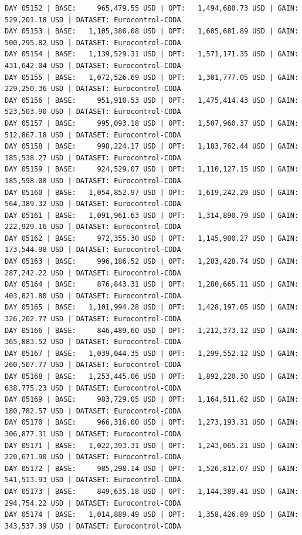 \documentclass[11pt,a4paper]{article}
\begin{document}
\begin{verbatim}
DAY 05152 | BASE:     965,479.55 USD | OPT:   1,494,680.73 USD | GAIN: 529,201.18 USD | DATASET: Eurocontrol-CODA
DAY 05153 | BASE:   1,105,386.08 USD | OPT:   1,605,681.89 USD | GAIN: 500,295.82 USD | DATASET: Eurocontrol-CODA
DAY 05154 | BASE:   1,139,529.31 USD | OPT:   1,571,171.35 USD | GAIN: 431,642.04 USD | DATASET: Eurocontrol-CODA
DAY 05155 | BASE:   1,072,526.69 USD | OPT:   1,301,777.05 USD | GAIN: 229,250.36 USD | DATASET: Eurocontrol-CODA
DAY 05156 | BASE:     951,910.53 USD | OPT:   1,475,414.43 USD | GAIN: 523,503.90 USD | DATASET: Eurocontrol-CODA
DAY 05157 | BASE:     995,093.18 USD | OPT:   1,507,960.37 USD | GAIN: 512,867.18 USD | DATASET: Eurocontrol-CODA
DAY 05158 | BASE:     998,224.17 USD | OPT:   1,183,762.44 USD | GAIN: 185,538.27 USD | DATASET: Eurocontrol-CODA
DAY 05159 | BASE:     924,529.07 USD | OPT:   1,110,127.15 USD | GAIN: 185,598.08 USD | DATASET: Eurocontrol-CODA
DAY 05160 | BASE:   1,054,852.97 USD | OPT:   1,619,242.29 USD | GAIN: 564,389.32 USD | DATASET: Eurocontrol-CODA
DAY 05161 | BASE:   1,091,961.63 USD | OPT:   1,314,890.79 USD | GAIN: 222,929.16 USD | DATASET: Eurocontrol-CODA
DAY 05162 | BASE:     972,355.30 USD | OPT:   1,145,900.27 USD | GAIN: 173,544.98 USD | DATASET: Eurocontrol-CODA
DAY 05163 | BASE:     996,186.52 USD | OPT:   1,283,428.74 USD | GAIN: 287,242.22 USD | DATASET: Eurocontrol-CODA
DAY 05164 | BASE:     876,843.31 USD | OPT:   1,280,665.11 USD | GAIN: 403,821.80 USD | DATASET: Eurocontrol-CODA
DAY 05165 | BASE:   1,101,994.28 USD | OPT:   1,428,197.05 USD | GAIN: 326,202.77 USD | DATASET: Eurocontrol-CODA
DAY 05166 | BASE:     846,489.60 USD | OPT:   1,212,373.12 USD | GAIN: 365,883.52 USD | DATASET: Eurocontrol-CODA
DAY 05167 | BASE:   1,039,044.35 USD | OPT:   1,299,552.12 USD | GAIN: 260,507.77 USD | DATASET: Eurocontrol-CODA
DAY 05168 | BASE:   1,253,445.06 USD | OPT:   1,892,220.30 USD | GAIN: 638,775.23 USD | DATASET: Eurocontrol-CODA
DAY 05169 | BASE:     983,729.05 USD | OPT:   1,164,511.62 USD | GAIN: 180,782.57 USD | DATASET: Eurocontrol-CODA
DAY 05170 | BASE:     966,316.00 USD | OPT:   1,273,193.31 USD | GAIN: 306,877.31 USD | DATASET: Eurocontrol-CODA
DAY 05171 | BASE:   1,022,393.31 USD | OPT:   1,243,065.21 USD | GAIN: 220,671.90 USD | DATASET: Eurocontrol-CODA
DAY 05172 | BASE:     985,298.14 USD | OPT:   1,526,812.07 USD | GAIN: 541,513.93 USD | DATASET: Eurocontrol-CODA
DAY 05173 | BASE:     849,635.18 USD | OPT:   1,144,389.41 USD | GAIN: 294,754.22 USD | DATASET: Eurocontrol-CODA
DAY 05174 | BASE:   1,014,889.49 USD | OPT:   1,358,426.89 USD | GAIN: 343,537.39 USD | DATASET: Eurocontrol-CODA

\end{verbatim}
\end{document}
